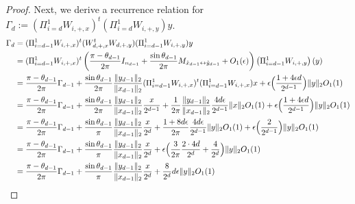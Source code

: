 \documentclass[11pt]{article}
\newcommand{\eps}{\epsilon}
\newcommand{\red}[1]{{\color{black} #1}}
\newcommand{\PiWd}{\Pi_{i=d}^1 W_{i,+,x}}
\newcommand{\PiWdy}{\Pi_{i=d}^1 W_{i,+,y}}
\newcommand{\PiWn}[1]{\Pi_{i={#1}}^1 W_{i,+,x}}
\newcommand{\PiWny}[1]{\Pi_{i={#1}}^1 W_{i,+,y}}
\newcommand{\Wnpx}[1]{W_{#1, +, x}}
\newcommand{\Wnpy}[1]{W_{#1, +, y}}
\begin{document}
\begin{proof}
Next, we  derive a recurrence relation for $\Gamma_d := (\PiWd)^t (\PiWdy) y$.  
\begin{align}
\Gamma_{d} &= (\PiWn{d-1})^t (\Wnpx{d}^t \Wnpy{d}) (\PiWny{d-1}) y\\
&= (\PiWn{d-1})^t  \left( \frac{\pi-\theta_{d-1}}{2\pi}I_{n_{d-1}} + \frac{\sin \theta_{d-1}}{2\pi} M_{\hat{x}_{d-1} \leftrightarrow \hat{y}_{d-1} }  + O_1(\eps) \right) \left( \Pi_{i=d-1}^1 W_{i,+,y} \right) (y) \notag \\
&= \frac{\pi-\theta_{d-1}}{2\pi} \Gamma_{d-1}  +  \frac{\sin \theta_{d-1}}{2\pi} \frac{\|y_{d-1}\|_2}{\|x_{d-1}\|_2} (\PiWn{d-1})^t (\PiWn{d-1}) x + \eps \Bigl( \frac{1 + 4 \eps d}{2^{d-1}} \Bigr) \|y\|_2 O_1(1) \notag\\
&= \frac{\pi-\theta_{d-1}}{2\pi} \Gamma_{d-1}  +  \frac{\sin \theta_{d-1}}{2\pi} \frac{\|y_{d-1}\|_2}{\|x_{d-1}\|_2} \frac{x}{2^{d-1}} + \frac{1}{2\pi} \frac{\|y_{d-1}\|_2}{\|x_{d-1}\|_2}  \frac{4 d\eps}{2^{d-1}} \|x\|_2 O_1(1) + \eps \Bigl( \frac{1 + 4 \eps d}{2^{d-1}} \Bigr) \|y\|_2 O_1(1) \notag\\
&= \frac{\pi-\theta_{d-1}}{2\pi} \Gamma_{d-1}  +  \frac{\sin \theta_{d-1}}{\pi} \frac{\|y_{d-1}\|_2}{\|x_{d-1}\|_2} \frac{x}{2^d} + \frac{1+8d\eps}{2\pi}  \frac{4 d\eps}{2^{d-1}} \|y\|_2 O_1(1) + \eps \Bigl( \frac{2}{2^{d-1}} \Bigr) \|y\|_2 O_1(1) \notag\\
&= \frac{\pi-\theta_{d-1}}{2\pi} \Gamma_{d-1}  +  \frac{\sin \theta_{d-1}}{\pi} \frac{\|y_{d-1}\|_2}{\|x_{d-1}\|_2} \frac{x}{2^d} + \eps \Bigl(\frac{3}{2\pi} \frac{2 \cdot 4 d }{2^d} +  \frac{4}{2^d} \Bigr) \|y\|_2  O_1(1) \notag\\
&= \frac{\pi-\theta_{d-1}}{2\pi} \Gamma_{d-1}  +  \frac{\sin \theta_{d-1}}{\pi} \frac{\|y_{d-1}\|_2}{\|x_{d-1}\|_2} \frac{x}{2^d} + \frac{8}{2^d} d \eps \|y\|_2 O_1(1) \notag\\

\end{align}
\end{proof}
\end{document}
